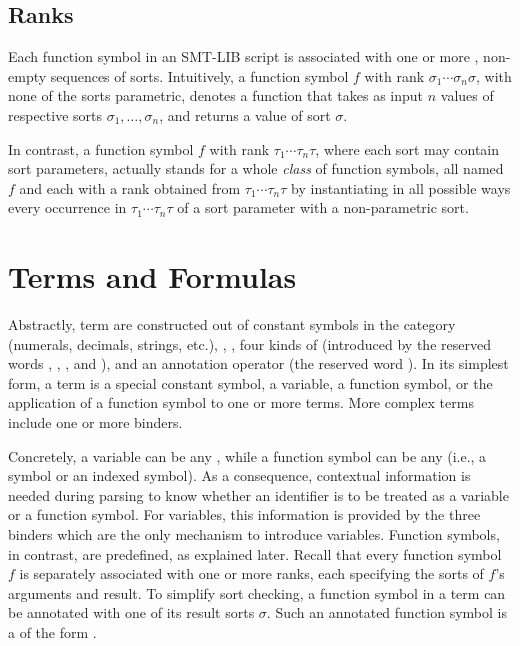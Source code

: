 \subsection{Ranks}

Each function symbol in an SMT-LIB script is associated with one or more 
, non-empty sequences of sorts.
Intuitively, a function symbol $f$ with rank $\sigma_1\cdots\sigma_n\sigma$,
with none of the sorts parametric,
denotes a function that takes as input $n$ values of respective sorts
$\sigma_1, \ldots, \sigma_n$,
and returns a value of sort $\sigma$.

In contrast, a function symbol $f$ with rank $\tau_1\cdots\tau_n\tau$,
where each sort may contain sort parameters,
actually stands for a whole \emph{class} of function symbols, 
all named $f$ and each with a rank obtained from $\tau_1\cdots\tau_n\tau$ 
by instantiating in all possible ways every occurrence in $\tau_1\cdots\tau_n\tau$
of a sort parameter with a non-parametric sort.


\section{Terms and Formulas} \label{sec:concrete-terms}

Abstractly, term are constructed out of 
constant symbols in the  category
(numerals, decimals, strings, etc.),
, 
, 
four kinds of  
(introduced by the reserved words , , , and ),
and an annotation operator (the reserved word \ter{!}).
In its simplest form, a term is 
a special constant symbol,
a variable,
a function symbol,
or the application of a function symbol to one or more terms.
More complex terms include one or more binders.

Concretely, a variable can be any ,
while a function symbol can be any 
(i.e., a symbol or an indexed symbol).
As a consequence, contextual information is needed during parsing
to know whether an identifier is to be treated as a variable or 
a function symbol. 
For variables, this information is provided by the three binders 
which are the only mechanism to introduce variables.
Function symbols, in contrast, are predefined, as explained later.
Recall that every function symbol $f$ is separately associated with one or more ranks,
each specifying the sorts of $f$'s arguments and result.
To simplify sort checking,
a function symbol in a term can be annotated with one of its result sorts $\sigma$.
Such an annotated function symbol is a 
of the form .
\bigskip

